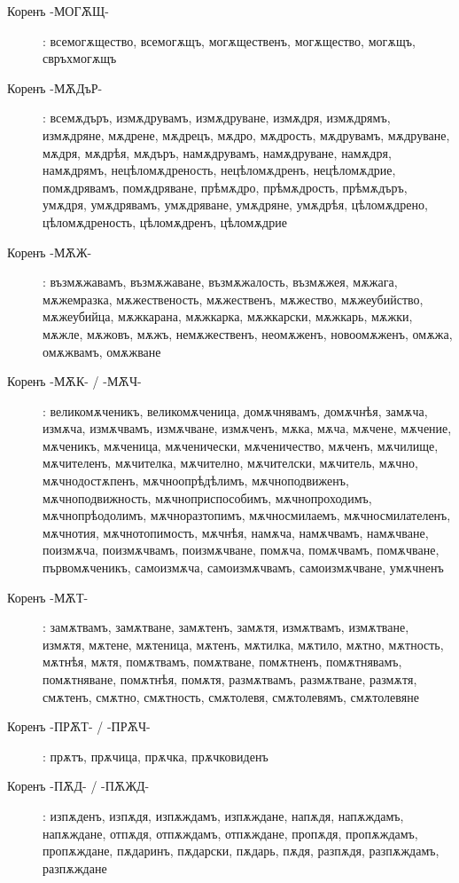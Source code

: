 \documentclass{article}
\begin{document}
\begin{description}
		\item[Коренъ -МОГѪЩ-]: всемогѫщество, всемогѫщъ, могѫщественъ, могѫщество, могѫщъ, свръхмогѫщъ
		
		\item[Коренъ -МѪДъР-]: всемѫдъръ, измѫдрувамъ, измѫдруване, измѫдря, измѫдрямъ, измѫдряне, мѫдрене, мѫдрецъ, мѫдро, мѫдрость, мѫдрувамъ, мѫдруване, мѫдря, мѫдрѣя, мѫдъръ, намѫдрувамъ, намѫдруване, намѫдря, намѫдрямъ, нецѣломѫдреность, нецѣломѫдренъ, нецѣломѫдрие, помѫдрявамъ, помѫдряване, прѣмѫдро, прѣмѫдрость, прѣмѫдъръ, умѫдря, умѫдрявамъ, умѫдряване, умѫдряне, умѫдрѣя, цѣломѫдрено, цѣломѫдреность, цѣломѫдренъ, цѣломѫдрие
		
		\item[Коренъ -МѪЖ-]: възмѫжавамъ, възмѫжаване, възмѫжалость, възмѫжея, мѫжага, мѫжемразка, мѫжественость, мѫжественъ, мѫжество, мѫжеубийство, мѫжеубийца, мѫжкарана, мѫжкарка, мѫжкарски, мѫжкарь, мѫжки, мѫжле, мѫжовъ, мѫжъ, немѫжественъ, неомѫженъ, новоомѫженъ, омѫжа, омѫжвамъ, омѫжване
		
		\item[Коренъ -МѪК- / -МѪЧ-]: великомѫченикъ, великомѫченица, домѫчнявамъ, домѫчнѣя, замѫча, измѫча, измѫчвамъ, измѫчване, измѫченъ, мѫка, мѫча, мѫчене, мѫчение, мѫченикъ, мѫченица, мѫченически, мѫченичество, мѫченъ, мѫчилище, мѫчителенъ, мѫчителка, мѫчително, мѫчителски, мѫчитель, мѫчно, мѫчнодостѫпенъ, мѫчноопрѣдѣлимъ, мѫчноподвиженъ, мѫчноподвижность, мѫчноприспособимъ, мѫчнопроходимъ, мѫчнопрѣодолимъ, мѫчноразтопимъ, мѫчносмилаемъ, мѫчносмилателенъ, мѫчнотия, мѫчнотопимость, мѫчнѣя, намѫча, намѫчвамъ, намѫчване, поизмѫча, поизмѫчвамъ, поизмѫчване, помѫча, помѫчвамъ, помѫчване, първомѫченикъ, самоизмѫча, самоизмѫчвамъ, самоизмѫчване, умѫчненъ
		
		\item[Коренъ -МѪТ-]: замѫтвамъ, замѫтване, замѫтенъ, замѫтя, измѫтвамъ, измѫтване, измѫтя, мѫтене, мѫтеница, мѫтенъ, мѫтилка, мѫтило, мѫтно, мѫтность, мѫтнѣя, мѫтя, помѫтвамъ, помѫтване, помѫтненъ, помѫтнявамъ, помѫтняване, помѫтнѣя, помѫтя, размѫтвамъ, размѫтване, размѫтя, смѫтенъ, смѫтно, смѫтность, смѫтолевя, смѫтолевямъ, смѫтолевяне
		
		\item[Коренъ -ПРѪТ- / -ПРѪЧ-]: прѫтъ, прѫчица, прѫчка, прѫчковиденъ
		
		\item[Коренъ -ПѪД- / -ПѪЖД-]: изпѫденъ, изпѫдя, изпѫждамъ, изпѫждане, напѫдя, напѫждамъ, напѫждане, отпѫдя, отпѫждамъ, отпѫждане, пропѫдя, пропѫждамъ, пропѫждане, пѫдаринъ, пѫдарски, пѫдарь, пѫдя, разпѫдя, разпѫждамъ, разпѫждане
		

\end{description}
\end{document}
